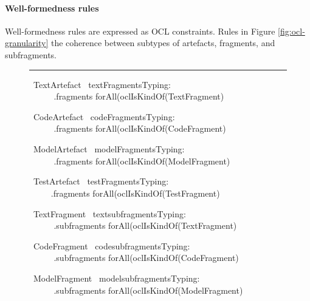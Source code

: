 \paragraph{Well-formedness rules}
Well-formedness rules are expressed as OCL constraints. 
Rules in Figure \ref{fig:ocl-granularity} the coherence between subtypes of artefacts, fragments, and subfragments. 
\begin{figure}[h]
\centering 
\rule{0.9\linewidth}{1pt}
\vspace{-0.2truecm}
\small
\begin{ocl}[0.85\linewidth]

\vspace{0.3truecm}\OCLcontext~TextArtefact \OCLinv ~textFragmentsTyping: 
\\ \verb+     + \OCLself.fragments \OCLarrow forAll(\OCLself \OCLarrow oclIsKindOf(TextFragment)

\vspace{0.3truecm}\OCLcontext~CodeArtefact \OCLinv ~codeFragmentsTyping: 
\\ \verb+     + \OCLself.fragments \OCLarrow forAll(\OCLself \OCLarrow oclIsKindOf(CodeFragment)

\vspace{0.3truecm}\OCLcontext~ModelArtefact \OCLinv ~modelFragmentsTyping: 
\\ \verb+     + \OCLself.fragments \OCLarrow forAll(\OCLself \OCLarrow oclIsKindOf(ModelFragment)

\vspace{0.3truecm}\OCLcontext~TestArtefact \OCLinv ~testFragmentsTyping: 
\\ \verb+     +\OCLself.fragments \OCLarrow forAll(\OCLself \OCLarrow oclIsKindOf(TestFragment)


\vspace{0.3truecm}\OCLcontext~TextFragment \OCLinv ~textsubfragmentsTyping: 
\\ \verb+     + \OCLself.subfragments \OCLarrow forAll(\OCLself \OCLarrow oclIsKindOf(TextFragment)

\vspace{0.3truecm}\OCLcontext~CodeFragment \OCLinv ~codesubfragmentsTyping: 
\\ \verb+     + \OCLself.subfragments \OCLarrow forAll(\OCLself \OCLarrow oclIsKindOf(CodeFragment)

\vspace{0.3truecm}\OCLcontext~ModelFragment \OCLinv ~modelsubfragmentsTyping: 
\\ \verb+     + \OCLself.subfragments \OCLarrow forAll(\OCLself \OCLarrow oclIsKindOf(ModelFragment)


\end{ocl}
\end{figure}
